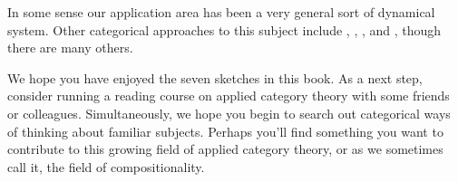 \documentclass[7Sketches]{subfiles}
\begin{document}
In some sense our application area has been a very general sort of dynamical system. Other categorical approaches to this subject include \cite{Joyal.Nielsen.Winskel:1996a}, \cite{Haghverdi.Tabuada.Pappas:2003a}, \cite{Ames.Sastry:2005a}, and \cite{Lawvere:1986a}, though there are many others.%

\bigskip

We hope you have enjoyed the seven sketches in this book. As a next step, consider running a reading course on applied category theory with some friends or colleagues. Simultaneously, we hope you begin to search out categorical ways of thinking about familiar subjects. Perhaps you'll find something you want to contribute to this growing field of applied category theory, or as we sometimes call it, the field of compositionality.%

%
%
\end{document}
